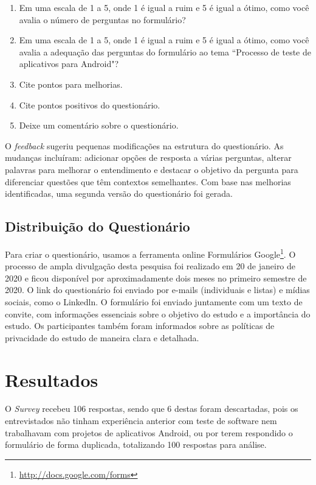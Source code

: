 \begin{enumerate}
    \item Em uma escala de 1 a 5, onde 1 é igual a ruim e 5 é igual a ótimo, como você avalia o número de perguntas no formulário?
    \item Em uma escala de 1 a 5, onde 1 é igual a ruim e 5 é igual a ótimo, como você avalia a adequação das perguntas do formulário ao tema ``Processo de teste de aplicativos para Android"?
    \item Cite pontos para melhorias.
    \item Cite pontos positivos do questionário.
    \item Deixe um comentário sobre o questionário.
\end{enumerate}

O \textit{feedback} sugeriu pequenas modificações na estrutura do questionário. As mudanças incluíram: adicionar opções de resposta a várias perguntas, alterar palavras para melhorar o entendimento e destacar o objetivo da pergunta para diferenciar questões que têm contextos semelhantes. Com base nas melhorias identificadas, uma segunda versão do questionário foi gerada.


\subsection{Distribuição do Questionário}

Para criar o questionário, usamos a ferramenta online Formulários Google\footnote{\url{http://docs.google.com/forms}}. O processo de ampla divulgação desta pesquisa foi realizado em 20 de janeiro de 2020 e ficou disponível por aproximadamente dois meses no primeiro semestre de 2020. O link do questionário foi enviado por e-mails (individuais e listas) e mídias sociais, como o Linkedln. O formulário foi enviado juntamente com um texto de convite, com informações essenciais sobre o objetivo do estudo e a importância do estudo. Os participantes também foram informados sobre as políticas de privacidade do estudo de maneira clara e detalhada.


\section{Resultados}\label{resultssurvey}

O \textit{Survey} recebeu 106 respostas, sendo que 6 destas foram descartadas, pois os entrevistados não tinham experiência anterior com teste de software nem trabalhavam com projetos de aplicativos Android, ou por terem respondido o formulário de forma duplicada, totalizando 100 respostas para análise. 

